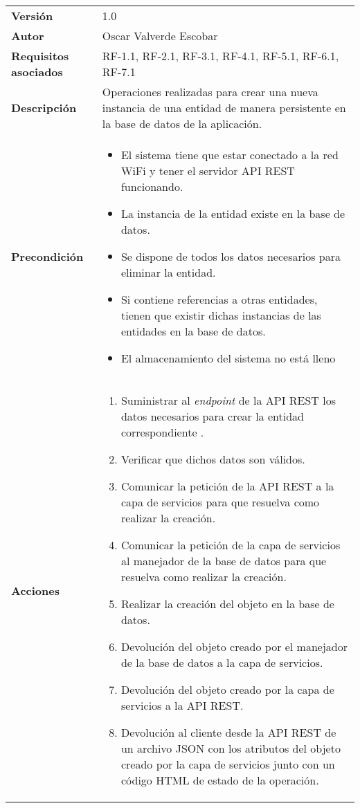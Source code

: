 \begin{longtable}{ p{} p{} }
  \textbf{Versión}              & 1.0    \\
    \textbf{Autor}                & Oscar Valverde Escobar \\
    \textbf{Requisitos asociados} & RF-1.1, RF-2.1, RF-3.1, RF-4.1, RF-5.1, RF-6.1, RF-7.1\\
    \textbf{Descripción}          & Operaciones realizadas para crear una nueva instancia de una entidad de manera persistente en la base de datos de la aplicación.\\
    \textbf{Precondición}         & 
    \begin{itemize}
        \item El sistema tiene que estar conectado a la red WiFi y tener el servidor API REST funcionando. 
        \item La instancia de la entidad existe en la base de datos. 
        \item Se dispone de todos los datos necesarios para eliminar la entidad.
        \item Si contiene referencias a otras entidades, tienen que existir dichas instancias de las entidades en la base de datos.
        \item El almacenamiento del sistema no está lleno
    \end{itemize}\\
    \textbf{Acciones}             &
    \begin{enumerate}
        \def\labelenumi{\arabic{enumi}.}
        \tightlist
        \item Suministrar al \textit{endpoint} de la API REST los datos necesarios para crear la entidad correspondiente .
        \item Verificar que dichos datos son válidos.
        \item Comunicar la petición de la API REST a la capa de servicios para que resuelva como realizar la creación.
        \item Comunicar la petición de la capa de servicios al manejador de la base de datos para que resuelva como realizar la creación.
        \item Realizar la creación del objeto en la base de datos.
        \item Devolución del objeto creado por el manejador de la base de datos a la capa de servicios.
        \item Devolución del objeto creado por la capa de servicios a la API REST.
        \item Devolución  al cliente  desde la API REST de un archivo JSON con los atributos del objeto creado por la capa de servicios junto con un código HTML de estado de la operación. 

\end{enumerate}
\end{longtable}
